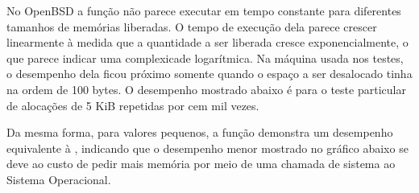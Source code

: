 No OpenBSD a função  não parece executar em tempo
constante para diferentes tamanhos de memórias liberadas. O tempo de
execução dela parece crescer linearmente à medida que a quantidade a
ser liberada cresce exponencialmente, o que parece indicar uma
complexicade logarítmica. Na máquina usada nos testes, o desempenho
dela ficou próximo somente quando o espaço a ser desalocado tinha na
ordem de 100 bytes. O desempenho mostrado abaixo é para o teste
particular de alocações de 5 KiB repetidas por cem mil vezes.

Da mesma forma, para valores pequenos, a função 
demonstra um desempenho equivalente à , indicando
que o desempenho menor mostrado no gráfico abaixo se deve ao custo de
pedir mais memória por meio de uma chamada de sistema ao Sistema
Operacional.












\fim
